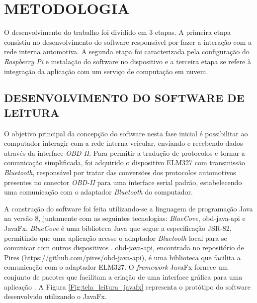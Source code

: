 \chapter{METODOLOGIA}\label{CAP5}

O desenvolvimento do trabalho foi dividido em 3 etapas. A primeira etapa consistiu no desenvolvimento do software responsável por fazer a interação com a rede interna automotiva. A segunda etapa foi caracterizada pela configuração do \textit{Raspberry Pi} e instalação do software no dispositivo e a terceira etapa se refere à integração da aplicação com um serviço de computação em nuvem.

\section{DESENVOLVIMENTO DO SOFTWARE DE LEITURA}
O objetivo principal da concepção do software nesta fase inicial é possibilitar ao computador interagir com a rede interna veicular, enviando e recebendo dados através da interface \textit{OBD-II}. Para permitir a tradução de protocolos e tornar a comunicação simplificada, foi adquirido o dispositivo ELM327 com transmissão \textit{Bluetooth}, responsável por tratar das conversões dos protocolos automotivos presentes no conector \textit{OBD-II} para uma interface serial padrão, estabelecendo uma comunicação com o adaptador \textit{Bluetooth} do computador.

A construção do software foi feita utilizando-se a linguagem de programação Java na versão 8, juntamente com as seguintes tecnologias: \textit{BlueCove}, obd-java-api e JavaFx. \textit{BlueCove} é uma biblioteca Java que segue a especificação JSR-82, permitindo que uma aplicação acesse o adaptador \textit{Bluetooth} local para se comunicar com outros dispositivos \cite{bluecove}. obd-java-api, encontrada no repositório de Pires (https://github.com/pires/obd-java-api), é uma biblioteca que facilita a comunicação com o adaptador ELM327. O \textit{framework} JavaFx fornece um conjunto de pacotes que facilitam a criação de uma interface gráfica para uma aplicação \cite{pawlan}. A Figura \ref{Fig:tela_leitura_javafx} representa o protótipo do software desenvolvido utilizando o JavaFx.

